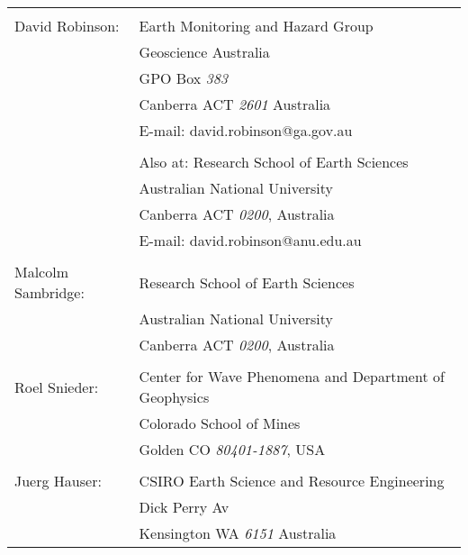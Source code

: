 \documentclass[12pt,double]{article}
\begin{document}
\begin{tabular}{lp{}}
 & \\
David Robinson: & Earth Monitoring and Hazard Group \\
 &  Geoscience Australia \\
 & GPO Box \emph{383} \\
 & Canberra ACT \emph{2601} Australia \\
 & E-mail: david.robinson@ga.gov.au\\
 & \\
 & Also at: Research School of Earth Sciences \\
 & Australian National University \\ 
 & Canberra ACT \emph{0200}, Australia \\
 & E-mail: david.robinson@anu.edu.au \\
 & \\
 Malcolm Sambridge: & Research School of Earth Sciences \\
 & Australian National University \\ 
 & Canberra ACT \emph{0200}, Australia \\
  & \\
Roel Snieder: & Center for Wave Phenomena and Department of Geophysics \\
 & Colorado School of Mines \\
 & Golden CO \emph{80401-1887}, USA \\
 & \\
Juerg Hauser: & CSIRO Earth Science and Resource Engineering \\
 & Dick Perry Av \\
 & Kensington WA \emph{6151} Australia
\end{tabular}

\clearpage

\end{document}
